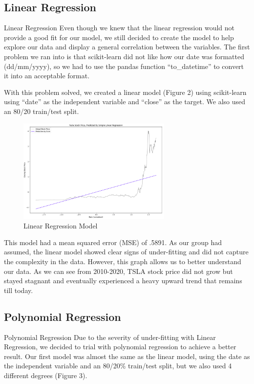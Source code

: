 \documentclass[12pt,a4paper]{article}
\begin{document}
\subsection{Linear Regression}
Linear Regression
Even though we knew that the linear regression would not provide a good fit for our model, we still decided to create the model to help explore our data and display a general correlation between the variables. The first problem we ran into is that scikit-learn did not like how our date was formatted (dd/mm/yyyy), so we had to use the pandas function “to\_datetime” to convert it into an acceptable format. 

With this problem solved, we created a linear model (Figure 2) using scikit-learn using “date” as the independent variable and “close” as the target. We also used an 80/20 train/test split.

\begin{figure}[h]
\caption{Linear Regression Model}
\centering
\includegraphics[width=3in]{./Figures/LinearRegression.png}
\end{figure}

This model had a mean squared error (MSE) of .5891. As our group had assumed, the linear model showed clear signs of under-fitting and did not capture the complexity in the data. However, this graph allows us to better understand our data. As we can see from 2010-2020, TSLA stock price did not grow but stayed stagnant and eventually experienced a heavy upward trend that remains till today.


\subsection{Polynomial Regression}
Polynomial Regression
Due to the severity of under-fitting with Linear Regression, we decided to trial with polynomial regression to achieve a better result. Our first model was almost the same as the linear model, using the date as the independent variable and an 80/20\% train/test split, but we also used 4 different degrees (Figure 3). 
\end{document}
